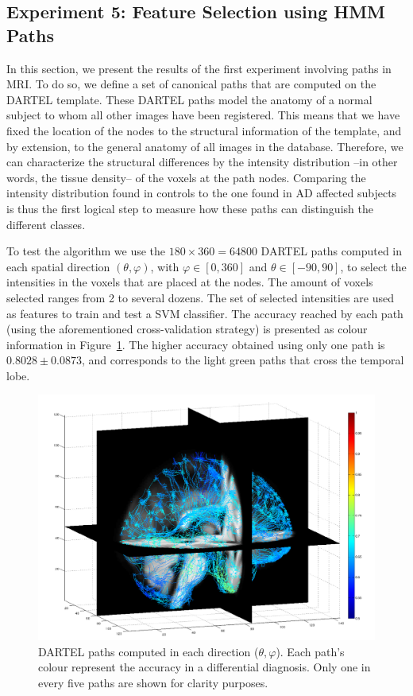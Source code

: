 \subsection{Experiment 5: Feature Selection using HMM Paths}

In this section, we present the results of the first experiment involving paths in MRI. To do so, we define a set of canonical paths that are computed on the DARTEL template. These DARTEL paths model the anatomy of a normal subject to whom all other images have been registered. This means that we have fixed the location of the nodes to the structural information of the template, and by extension, to the general anatomy of all images in the database. Therefore, we can characterize the structural differences by the intensity distribution --in other words, the tissue density--  of the voxels at the path nodes. Comparing the intensity distribution found in controls to the one found in AD affected subjects is thus the first logical step to measure how these paths can distinguish the different classes.

To test the algorithm we use the $180\times360=64800$ DARTEL paths computed in each spatial direction $(\theta,\varphi)$, with $\varphi\in[0,360]$ and $\theta\in[-90,90]$, to select the intensities in the voxels that are placed at the nodes. The amount of voxels selected ranges from 2 to several dozens. The set of selected intensities are used as features to train and test a SVM classifier. The accuracy reached by each path (using the aforementioned cross-validation strategy) is presented as colour information in Figure~\ref{fig:accuracyMap}. The higher accuracy obtained using only one path is $0.8028\pm0.0873$, and corresponds to the light green paths that cross the temporal lobe. 

\begin{figure}
	\begin{center}
		\includegraphics[width=\columnwidth]{Graphics/ch6/accuracyPaths2}
		\caption{DARTEL paths computed in each direction ($\theta,\varphi$). Each path's colour represent the accuracy in a differential diagnosis. Only one in every five paths are shown for clarity purposes.}
		\label{fig:accuracyMap}
	\end{center}
\end{figure}

